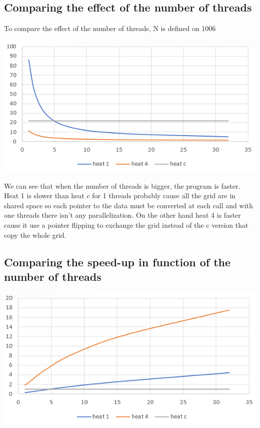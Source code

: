 \documentclass{report}
\begin{document}
\subsection{Comparing the effect of the number of threads}

To compare the effect of the number of threads, N is defined on 1006

\begin{center}
    \includegraphics[scale=1]{Images/Time_depending_threads.png}
    \label{fig10}
\end{center}

We can see that when the number of threads is bigger, the program is faster. Heat 1 is slower than heat c for 1 threads probably cause all the grid are in shared space so each pointer to the data must be converted at each call and with one threads there isn't any parallelization. On the other hand heat 4 is faster cause it use a pointer flipping to exchange the grid instead of the c version that copy the whole grid.

\subsection{Comparing the speed-up in function of the number of threads}

\begin{center}
    \includegraphics[scale=1]{Images/speeed_up_depending_threads.png}
    \label{fig11}
\end{center}
\end{document}

